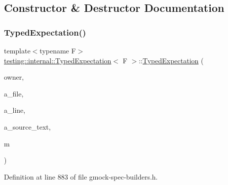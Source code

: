 \subsection{Constructor \& Destructor Documentation}
\mbox{\label{classtesting_1_1internal_1_1TypedExpectation_a10bd0a8fa0db37215be42e1c61ccbc28}} 
\subsubsection{\texorpdfstring{Typed\+Expectation()}{TypedExpectation()}}
{\footnotesize\ttfamily template$<$typename F$>$ \\
\hyperlink{classtesting_1_1internal_1_1TypedExpectation}{testing\+::internal\+::\+Typed\+Expectation}$<$ F $>$\+::\hyperlink{classtesting_1_1internal_1_1TypedExpectation}{Typed\+Expectation} (\begin{DoxyParamCaption}\item[{\hyperlink{classtesting_1_1internal_1_1FunctionMockerBase}{Function\+Mocker\+Base}$<$ F $>$ $\ast$}]{owner,  }\item[{const char $\ast$}]{a\+\_\+file,  }\item[{int}]{a\+\_\+line,  }\item[{const \hyperlink{namespacetesting_1_1internal_a8e8ff5b11e64078831112677156cb111}{string} \&}]{a\+\_\+source\+\_\+text,  }\item[{const \hyperlink{classtesting_1_1internal_1_1TypedExpectation_a8f10e3906761cc5c10fa3561c6e8938e}{Argument\+Matcher\+Tuple} \&}]{m }\end{DoxyParamCaption})\hspace{0.3cm}{\ttfamily [inline]}}



Definition at line 883 of file gmock-\/spec-\/builders.\+h.


